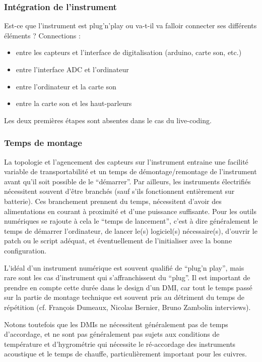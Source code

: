 \subsubsection{Intégration de l'instrument}

Est-ce que l'instrument est plug'n'play ou va-t-il va falloir connecter ses différents éléments ? Connections : 
\vspace{-1em}
\begin{itemize}[noitemsep]
	\item entre les capteurs et l'interface de digitalisation (arduino, carte son, etc.)
	\item entre l'interface ADC et l'ordinateur
	\item entre l'ordinateur et la carte son
	\item entre la carte son et les haut-parleurs
\end{itemize}

Les deux premières étapes sont absentes dans le cas du live-coding.


\subsubsection{Temps de montage}

La topologie et l'agencement des capteurs sur l'instrument entraine une facilité variable de transportabilité et un temps de démontage/remontage de l'instrument avant qu'il soit possible de le ``démarrer''.
Par ailleurs, les instruments électrifiés nécessitent souvent d'être branchés (sauf s'ils fonctionnent entièrement sur batterie). Ces branchement prennent du temps, nécessitent d'avoir des alimentations en courant à proximité et d'une puissance suffisante. Pour les outils numériques se rajoute à cela le ``temps de lancement'', c'est à dire généralement le temps de démarrer l'ordinateur, de lancer le(s) logiciel(s) nécessaire(s), d'ouvrir le patch ou le script adéquat, et éventuellement de l'initialiser avec la bonne configuration.

L'idéal d'un instrument numérique est souvent qualifié de ``plug'n play'', mais rare sont les cas d'instrument qui s'affranchissent du ``plug''. Il est important de prendre en compte cette durée dans le design d'un \gls{DMI}, car tout le temps passé sur la partie de montage technique est souvent pris au détriment du temps de répétition (cf. François Dumeaux, Nicolas Bernier, Bruno Zambolin interviews). 

Notons toutefois que les \glspl{DMI} ne nécessitent généralement pas de temps d'accordage, et ne sont pas généralement pas sujets aux conditions de température et d'hygrométrie qui nécessite le ré-accordage des instruments acoustique et le temps de chauffe, particulièrement important pour les cuivres.



